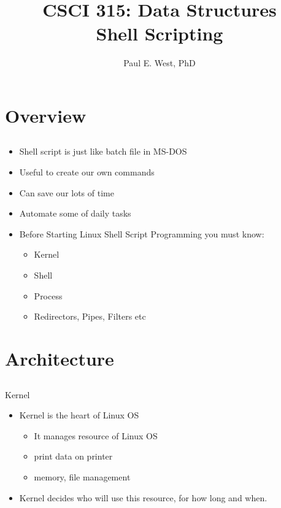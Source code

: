\documentclass{beamer}
\title{CSCI 315: Data Structures \\ Shell Scripting}
\author{Paul E. West, PhD}
\institute{
  Department of Computer Science\\
  Charleston Southern University
}
\begin{document}
\begin{frame}
  \titlepage
\end{frame}

\section{Overview}
\subsection{}

\begin{frame}{}
\begin{itemize}
\item Shell script is just like batch file in MS-DOS
\item Useful to create our own commands
\item Can save our lots of time
\item Automate some of daily tasks
\end{itemize}
\end{frame}

\begin{frame}{}
\begin{itemize}
\item Before Starting Linux Shell Script Programming you must know:
\begin{itemize}
\item Kernel
\item Shell   
\item Process
\item Redirectors, Pipes, Filters etc
\end{itemize}
\end{itemize}
\end{frame}

\section{Architecture}
\subsection{}

\begin{frame}{Kernel}
\begin{itemize}
\item Kernel is the heart of Linux OS
\begin{itemize}
\item It manages resource of Linux OS
\item print data on printer
\item memory, file management
\end{itemize}
\item Kernel decides who will use this resource, for how long and when.
\end{itemize}
\end{frame}
\end{document}
